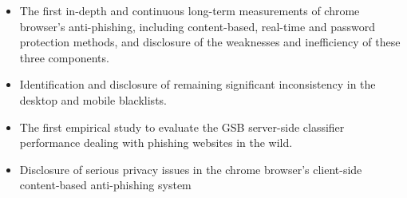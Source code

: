 \documentclass[letterpaper,twocolumn,10pt]{article}
\begin{document}
\begin{itemize}
    \item The first in-depth and continuous long-term measurements of chrome browser's anti-phishing, including content-based, real-time and password protection methods, and disclosure of the weaknesses and inefficiency of these three components.
    \item Identification and disclosure of remaining significant inconsistency in the desktop and mobile blacklists.
    \item The first empirical study to evaluate the GSB server-side classifier performance dealing with phishing websites in the wild.
    \item Disclosure of serious privacy issues in the chrome browser's client-side content-based anti-phishing system
\end{itemize}





 
\end{document}
